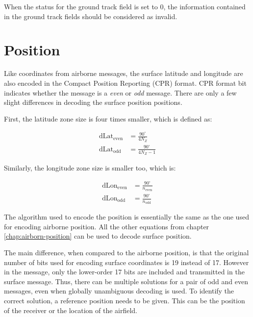 When the status for the ground track field is set to 0, the information contained in the ground track fields should be considered as invalid.

\section{Position}

Like coordinates from airborne messages, the surface latitude and longitude are also encoded in the Compact Position Reporting (CPR) format. CPR format bit indicates whether the message is a \emph{even} or \emph{odd} message. There are only a few slight differences in decoding the surface position positions. 

First, the latitude zone size is four times smaller, which is defined as:

\begin{equation}
\begin{split}
    \mathrm{dLat}_\mathrm{even} &= \frac{90^\circ}{4 N_Z} \\
    \mathrm{dLat}_\mathrm{odd} &= \frac{90^\circ}{4 N_Z - 1}
\end{split}
\end{equation}

Similarly, the longitude zone size is smaller too, which is:

\begin{equation}
\begin{split}
    \mathrm{dLon}_\mathrm{even} &= \frac{90^\circ}{n_\mathrm{even}} \\
    \mathrm{dLon}_\mathrm{odd} &= \frac{90^\circ}{n_\mathrm{odd}}
\end{split}
\end{equation}

The algorithm used to encode the position is essentially the same as the one used for encoding airborne position. All the other equations from chapter \ref{chap:airborn-position} can be used to decode surface position.

The main difference, when compared to the airborne position, is that the original number of bits used for encoding surface coordinates is 19 instead of 17. However in the message, only the lower-order 17 bits are included and transmitted in the surface message. Thus, there can be multiple solutions for a pair of odd and even messages, even when globally unambiguous decoding is used. To identify the correct solution, a reference position needs to be given. This can be the position of the receiver or the location of the airfield.

